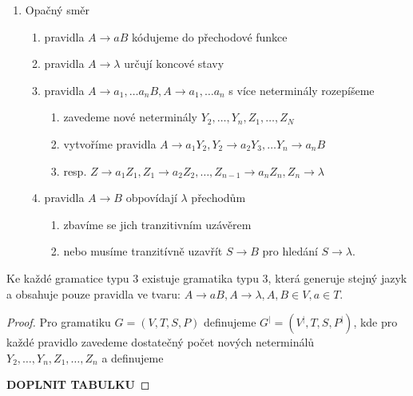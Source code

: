 \documentclass[../main.tex]{subfiles}
\begin{document}
\begin{enumerate}
    \item Opačný směr
    \begin{enumerate}
        \item pravidla $A \rightarrow aB$ kódujeme do přechodové funkce
        \item pravidla $A \rightarrow \lambda$ určují koncové stavy
        \item pravidla $A \rightarrow a_1,\dots a_n B, A \rightarrow a_1,\dots a_n$ s více neterminály rozepíšeme
        \begin{enumerate}
            \item zavedeme nové neterminály $Y_2,\dots, Y_n, Z_1,\dots, Z_N$
            \item vytvoříme pravidla $A \rightarrow a_1Y_2, Y_2 \rightarrow a_2Y_3,\dots Y_n \rightarrow a_n B$
            \item resp. $Z \rightarrow a_1Z_1, Z_1 \rightarrow a_2Z_2,\dots, Z_{n-1} \rightarrow a_nZ_n, Z_n \rightarrow \lambda$
        \end{enumerate}
        \item pravidla $A \rightarrow B$ obpovídají $\lambda$ přechodům
        \begin{enumerate}
            \item zbavíme se jich tranzitivním uzávěrem
            \item nebo musíme tranzitívně uzavřít $S\rightarrow B$ pro hledání $S \rightarrow \lambda$.
        \end{enumerate}
    \end{enumerate}
\end{enumerate}

\begin{theorem}
    Ke každé gramatice typu 3 existuje gramatika typu 3, která generuje stejný jazyk a 
    obsahuje pouze pravidla ve tvaru: $A \rightarrow aB, A \rightarrow \lambda, A,B \in V, a\in T$.
    \begin{proof}
        Pro gramatiku $G = (V,T,S,P)$ definujeme $G^| = (V^|,T,S,P^|)$, kde pro každé pravidlo zavedeme dostatečný počet nových
        neterminálů $Y_2,\dots, Y_n, Z_1,\dots, Z_n$ a definujeme
        
        \textbf{DOPLNIT TABULKU}
    \end{proof}
\end{theorem}
\end{document}
